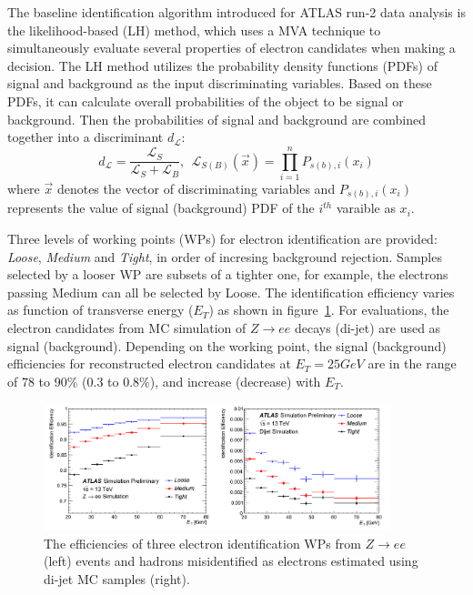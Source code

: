 The baseline identification algorithm introduced for ATLAS run-2 data analysis is the likelihood-based (LH) method, which uses a MVA technique to simultaneously evaluate several properties of electron candidates when making a decision.
The LH method utilizes the probability density functions (PDFs) of signal and background as the input discriminating variables.
Based on these PDFs, it can calculate overall probabilities of the object to be signal or background.
Then the probabilities of signal and background are combined together into a discriminant $d_{\mathcal{L}}$:
\begin{equation}
	d_{\mathcal{L}} = \frac{\mathcal{L}_{S}}{\mathcal{L}_{S} + \mathcal{L}_{B}},
	~~ \mathcal{L}_{S(B)}(\vec{x}) = \prod_{i=1}^{n} P_{s(b),i}(x_{i})	
\end{equation}
where $\vec{x}$ denotes the vector of discriminating variables and $P_{s(b),i}(x_{i})$ represents the value of signal (background) PDF of the $i^{th}$ varaible as $x_{i}$.

Three levels of working points (WPs) for electron identification are provided: \textit{Loose}, \textit{Medium} and \textit{Tight}, in order of incresing background rejection.
Samples selected by a looser WP are subsets of a tighter one, for example, the electrons passing Medium can all be selected by Loose.
The identification efficiency varies as function of transverse energy ($E_{T}$) as shown in figure~\ref{fig:ele_IDeff}.
For evaluations, the electron candidates from MC simulation of $Z \rightarrow ee$ decays (di-jet) are used as signal (background).
Depending on the working point, the signal (background) efficiencies for reconstructed electron candidates at $E_{T} = 25 GeV$ are in the range of 78 to 90\% (0.3 to 0.8\%), and increase (decrease) with $E_{T}$.
\begin{figure}[!htb]
  \centering
  \includegraphics[width=0.9\textwidth]{figures/Simulation/ele_id_eff.png}
  \caption{The efficiencies of three electron identification WPs from $Z \rightarrow ee$ (left) events and hadrons misidentified as electrons estimated using di-jet MC samples (right).}
  \label{fig:ele_IDeff}
\end{figure}

